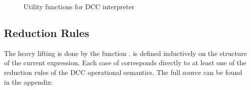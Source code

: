 \begin{figure}[!h]
\begin{Shaded}
\begin{Highlighting}[]
\FunctionTok{=}  
  \NormalTok{(} \NormalTok{(} \OtherTok{->} \FunctionTok{==} 
  \OtherTok{->} 
  
\FunctionTok{=}  

\FunctionTok{=}  
   \OtherTok{->} \NormalTok{[]}
  \OtherTok{->} 
   \FunctionTok{=}  
\end{Highlighting}
\end{Shaded}
\caption{Utility functions for DCC interpreter}
\end{figure}

\subsection{Reduction Rules}
The heavy lifting is done by the function .  is defined inductively on the structure of the current expression. Each case of  corresponds directly to at least one of the reduction rules of the DCC operational semantics. The full source can be found in the appendix: %


